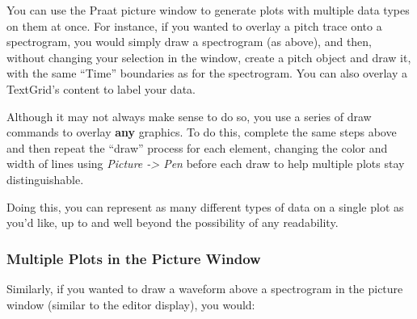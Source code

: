 \documentclass[11pt]{article}
\begin{document}
You can use the Praat picture window to generate plots with multiple
data types on them at once. For instance, if you wanted to overlay a
pitch trace onto a spectrogram, you would simply draw a spectrogram (as
above), and then, without changing your selection in the window, create
a pitch object and draw it, with the same ``Time'' boundaries as for the
spectrogram. You can also overlay a TextGrid's content to label your
data.

Although it may not always make sense to do so, you use a series of draw
commands to overlay \textbf{any} graphics. To do this, complete the same
steps above and then repeat the ``draw'' process for each element,
changing the color and width of lines using \emph{Picture
-\textgreater{} Pen} before each draw to help multiple plots stay
distinguishable.

Doing this, you can represent as many different types of data on a
single plot as you'd like, up to and well beyond the possibility of any
readability.

\hypertarget{multiple-plots-in-the-picture-window}{%
\subsubsection{Multiple Plots in the Picture
Window}\label{multiple-plots-in-the-picture-window}}

Similarly, if you wanted to draw a waveform above a spectrogram in the
picture window (similar to the editor display), you would:
\end{document}
